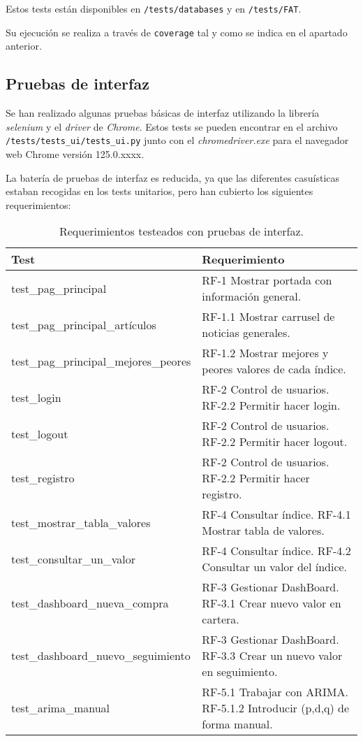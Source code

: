 Estos tests están disponibles en \texttt{/tests/databases} y en \texttt{/tests/FAT}.  

Su ejecución se realiza a través de \texttt{coverage} tal y como se indica en el apartado anterior. 


\subsection{Pruebas de interfaz}

Se han realizado algunas pruebas básicas de interfaz utilizando la librería \emph{selenium}\citep{online:selenium} y el \emph{driver} de \emph{Chrome}. Estos tests se pueden encontrar en el archivo \texttt{/tests/tests\_ui/tests\_ui.py} junto con el \emph{chromedriver.exe}\citep{online:chrome_driver} para el navegador web Chrome versión 125.0.xxxx. 

La batería de pruebas de interfaz es reducida, ya que las diferentes casuísticas estaban recogidas en los tests unitarios, pero han cubierto los siguientes requerimientos:

\begin{table}[H]
\centering
\begin{tabularx}{\textwidth}{>{\ttfamily}lX}
\toprule
\textnormal{Test} & Requerimiento \\
\midrule
test\_pag\_principal & RF-1 Mostrar portada con información general. \\
test\_pag\_principal\_artículos & RF-1.1 Mostrar carrusel de noticias generales. \\
test\_pag\_principal\_mejores\_peores & RF-1.2 Mostrar mejores y peores valores de cada índice. \\
test\_login & RF-2 Control de usuarios. RF-2.2 Permitir hacer login. \\
test\_logout & RF-2 Control de usuarios. RF-2.2 Permitir hacer logout. \\
test\_registro & RF-2 Control de usuarios. RF-2.2 Permitir hacer registro. \\
test\_mostrar\_tabla\_valores & RF-4 Consultar índice. RF-4.1 Mostrar tabla de valores. \\
test\_consultar\_un\_valor & RF-4 Consultar índice. RF-4.2 Consultar un valor del índice. \\
test\_dashboard\_nueva\_compra & RF-3 Gestionar DashBoard. RF-3.1 Crear nuevo valor en cartera. \\
test\_dashboard\_nuevo\_seguimiento & RF-3 Gestionar DashBoard. RF-3.3 Crear un nuevo valor en seguimiento. \\
test\_arima\_manual & RF-5.1 Trabajar con ARIMA. RF-5.1.2 Introducir (p,d,q) de forma manual. \\
\bottomrule
\end{tabularx}
\caption{Requerimientos testeados con pruebas de interfaz.}
\label{requisitos-test}
\end{table}

